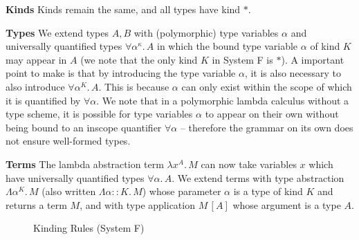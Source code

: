 \documentclass[acmsmall, 9pt]{article}
\begin{document}
\textbf{Kinds} Kinds remain the same, and all types have kind $*$.

\textbf{Types} We extend types $A, B$ with (polymorphic) type variables $\alpha$ and universally quantified types $\forall \alpha^{\kappa}. \, A$ in which the bound type variable $\alpha$ of kind $K$ may appear in $A$ (we note that the only kind $K$ in System F is $*$). A important point to make is that by introducing the type variable $\alpha$, it is also necessary to also introduce $\forall \alpha^K.\, A$. This is because $\alpha$ can only exist within the scope of which it is quantified by $\forall \alpha$. We note that in a polymorphic lambda calculus without a type scheme, it is possible for type variables $\alpha$ to appear on their own without being bound to an inscope quantifier $\forall \alpha$ -- therefore the grammar on its own does not ensure well-formed types.

\textbf{Terms} The lambda abstraction term $\lambda x^A . \, M$ can now take variables $x$ which have universally quantified types $\forall \alpha. \, A$. We extend terms with type abstraction $\Lambda \alpha^K . \, M$ (also written $\Lambda \alpha :: K . \, M$) whose parameter $\alpha$ is a type of kind $K$ and returns a term $M$, and with type application $M \, [A]$ whose argument is a type $A$.

\begin{figure}[H]
\flushleft {}
\caption{Kinding Rules (System F)}
\end{figure}
\end{document}
